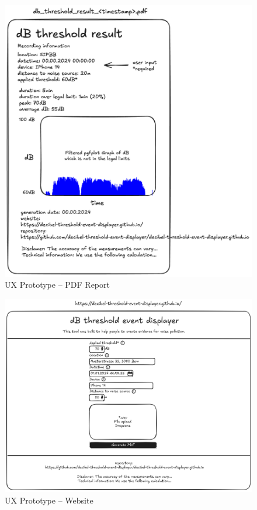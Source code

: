 \begin{figure}[H]
    \centering
    \includegraphics[width=\textwidth]{../assets/ux_prototype.png}
    \caption{UX Prototype – PDF Report}\label{fig:ux_prototype_pdf_report}
\end{figure}

\begin{figure}[H]
    \centering
    \includegraphics[width=\textwidth]{../assets/ux_prototype_website.png}
    \caption{UX Prototype – Website}\label{fig:ux_prototype_website}
\end{figure}

